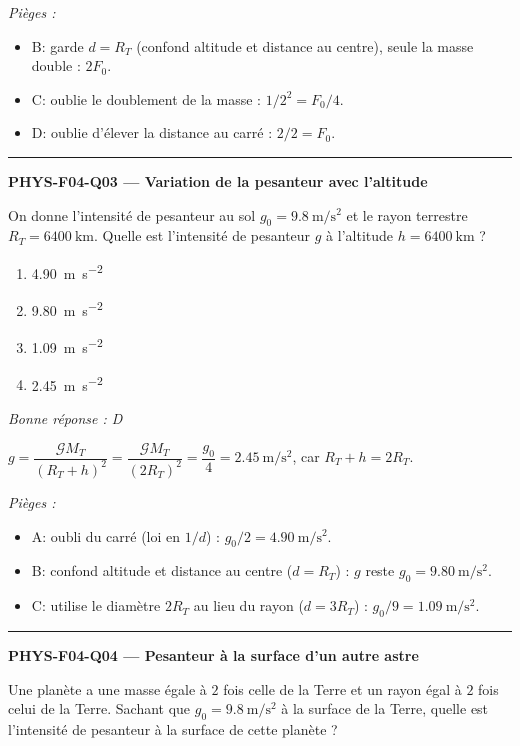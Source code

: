 \documentclass[11pt,a4paper]{article}
\begin{document}
\textit{Pièges :}
\begin{itemize}
\item B: garde $d=R_T$ (confond altitude et distance au centre), seule la masse double : $2F_0$.
\item C: oublie le doublement de la masse : $1/2^2=F_0/4$.
\item D: oublie d'élever la distance au carré : $2/2=F_0$.
\end{itemize}
\vspace{8pt}\hrule\vspace{8pt}
\noindent\textbf{PHYS-F04-Q03 --- Variation de la pesanteur avec l'altitude}\par
On donne l'intensité de pesanteur au sol $g_0=\qty{9.8}{\metre\per\second\squared}$ et le rayon terrestre $R_T=\qty{6400}{\kilo\metre}$. Quelle est l'intensité de pesanteur $g$ à l'altitude $h=\qty{6400}{\kilo\metre}$ ?
\begin{enumerate}[label=\Alph*)]
\item \qty{4.90}{\metre\per\second\squared}
\item \qty{9.80}{\metre\per\second\squared}
\item \qty{1.09}{\metre\per\second\squared}
\item \qty{2.45}{\metre\per\second\squared}
\end{enumerate}
\textit{Bonne réponse : D}\par
$g=\dfrac{\mathcal{G}M_T}{(R_T+h)^2}=\dfrac{\mathcal{G}M_T}{(2R_T)^2}=\dfrac{g_0}{4}=\qty{2.45}{\metre\per\second\squared}$, car $R_T+h=2R_T$.\par
\textit{Pièges :}
\begin{itemize}
\item A: oubli du carré (loi en $1/d$) : $g_0/2=\qty{4.90}{\metre\per\second\squared}$.
\item B: confond altitude et distance au centre ($d=R_T$) : $g$ reste $g_0=\qty{9.80}{\metre\per\second\squared}$.
\item C: utilise le diamètre $2R_T$ au lieu du rayon ($d=3R_T$) : $g_0/9=\qty{1.09}{\metre\per\second\squared}$.
\end{itemize}
\vspace{8pt}\hrule\vspace{8pt}
\noindent\textbf{PHYS-F04-Q04 --- Pesanteur à la surface d'un autre astre}\par
Une planète a une masse égale à $2$ fois celle de la Terre et un rayon égal à $2$ fois celui de la Terre. Sachant que $g_0=\qty{9.8}{\metre\per\second\squared}$ à la surface de la Terre, quelle est l'intensité de pesanteur à la surface de cette planète ?
\end{document}
